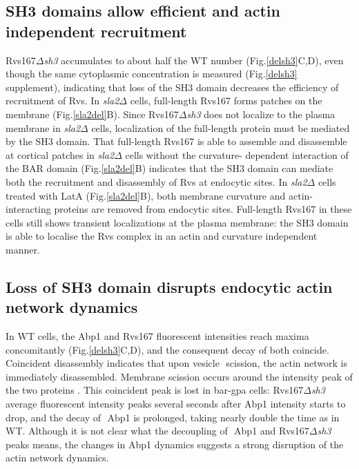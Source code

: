 \documentclass[9pt,lineno]{elife}
\begin{document}
\subsection{SH3 domains allow efficient and actin independent recruitment}
Rvs167\textit{$\Delta$sh3} accumulates to about half the WT number (Fig.\ref{delsh3}C,D), even though the same cytoplasmic concentration is measured (Fig.\ref{delsh3} supplement), indicating that loss of the SH3 domain decreases the efficiency of recruitment of Rvs. In \textit{sla2$\Delta$} cells, full-length Rvs167 forms patches on the membrane (Fig.\ref{sla2del}B). Since Rvs167\textit{$\Delta$sh3} does not localize to the plasma membrane in \textit{sla2$\Delta$} cells, localization of the full-length protein must be mediated by the SH3 domain. That full-length Rvs167 is able to assemble and disassemble at cortical patches in \textit{sla2$\Delta$} cells without the curvature- dependent interaction of the BAR domain (Fig.\ref{sla2del}B) indicates that the SH3 domain can mediate both the recruitment and disassembly of Rvs at endocytic sites. In \textit{sla2$\Delta$} cells treated with LatA (Fig.\ref{sla2del}B), both membrane curvature and actin-interacting proteins are removed from endocytic sites. Full-length Rvs167 in these cells still shows transient localizations at the plasma membrane: the SH3 domain is able to localise the Rvs complex in an actin and curvature independent manner.  

\subsection{Loss of SH3 domain disrupts endocytic actin network dynamics}
In WT cells, the Abp1 and Rvs167 fluorescent intensities reach maxima concomitantly (Fig.\ref{delsh3}C,D), and the consequent decay of both coincide. Coincident disassembly indicates that upon vesicle  scission, the actin network is immediately disassembled. Membrane scission occurs around the intensity peak of the two proteins \citep{Kukulski2012,Picco2015}. This coincident peak is lost in bar-gpa cells: Rvs167\textit{$\Delta$sh3} average fluorescent intensity peaks several seconds after Abp1 intensity starts to drop, and the decay of  Abp1 is prolonged, taking nearly double the time as in WT. Although it is not clear what the decoupling of  Abp1 and Rvs167\textit{$\Delta$sh3} peaks means, the changes in Abp1 dynamics suggests a strong disruption of the actin network dynamics.
\end{document}
